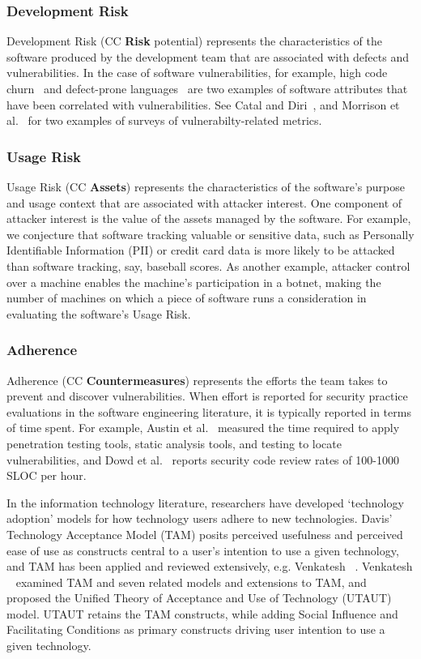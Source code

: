 \subsubsection{Development Risk}
Development Risk (CC \textbf{Risk} potential) represents the characteristics of the software produced by the development team that are associated with defects and vulnerabilities. In the case of software vulnerabilities, for example, high code churn~\cite{shin2011evaluating} and defect-prone languages~\cite{ray2014a} are two examples of software attributes that have been correlated with vulnerabilities. See Catal and Diri~\cite{catal2009a}, and Morrison et al.~\cite{morrison2014mapping} for two examples of surveys of vulnerabilty-related metrics. 

\subsubsection{Usage Risk}
Usage Risk (CC \textbf{Assets}) represents the characteristics of the software's purpose and usage context that are associated with attacker interest. One component of attacker interest is the value of the assets managed by the software. For example, we conjecture that software tracking valuable or sensitive data, such as Personally Identifiable Information (PII) or credit card data is more likely to be attacked than software tracking, say, baseball scores. As another example, attacker control over a machine enables the machine's participation in a botnet, making the number of machines on which a piece of software runs a consideration in evaluating the software's Usage Risk.

\subsubsection{Adherence}
\label{sec:model_contruct_adherence}
Adherence (CC \textbf{Countermeasures}) represents the efforts the team takes to prevent and discover vulnerabilities. When effort is reported for security practice evaluations in the software engineering literature, it is typically reported in terms of time spent. For example, Austin et al.~\cite{austin2011one} measured the time required to apply penetration testing tools, static analysis tools, and testing to locate vulnerabilities, and Dowd et al.~\cite{dowd2006the} reports security code review rates of 100-1000 SLOC per hour. 

In the information technology literature, 
researchers have developed `technology adoption' models for how technology users adhere to new technologies. Davis' ~\cite{davis1986tam} Technology Acceptance Model (TAM) posits perceived usefulness and perceived ease of use as constructs central to a user's intention to use a given technology, and TAM has been applied and reviewed extensively, e.g. Venkatesh ~\cite{venkatesh2003user}. Venkatesh ~\cite{venkatesh2003user} examined TAM and seven related models and extensions to TAM, and proposed the Unified Theory of Acceptance and Use of Technology (UTAUT) model. UTAUT retains the TAM constructs, while adding Social Influence and Facilitating Conditions as primary constructs driving user intention to use a given technology. 

